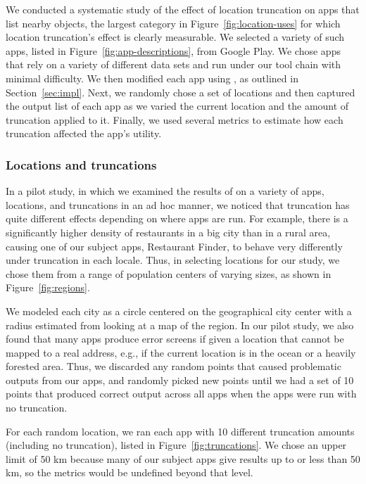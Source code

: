 We conducted a systematic study of the effect of location truncation
on apps that list nearby objects, the largest category in
Figure~\ref{fig:location-uses} for which location truncation's effect is clearly
measurable. We selected a variety of such apps, listed in
Figure~\ref{fig:app-descriptions}, from Google Play. We chose apps
that rely on a variety of different data sets and run under our tool
chain with minimal difficulty.
We then modified each app using \fuzzer, as outlined
in Section~\ref{sec:impl}. Next, we randomly chose a set of locations and
then captured the output list of each app as we varied the current
location and the amount of truncation applied to it. Finally, we used
several metrics to estimate how each truncation affected the app's
utility.

\subsubsection{Locations and truncations}

In a pilot study, in which we examined the results of \fuzzer{} on a
variety of apps, locations, and truncations in an ad hoc manner,
we noticed that truncation has quite different
effects depending on where apps are
run. For example, there is a significantly higher density of restaurants in
a big city than in a rural area, causing one of our subject apps,
Restaurant Finder, to behave very differently under truncation in each locale.
Thus, in selecting locations for
our study, we chose them from a range of population centers of varying
sizes, as shown in Figure~\ref{fig:regions}. 

We modeled each city as a circle centered on the geographical 
city center with a radius estimated
from looking at a map of the region. In
our pilot study, we also found that many apps produce error screens if
given a location that cannot be mapped to a real address, e.g., if the
current location is in the ocean or a heavily forested area.
Thus, we discarded any random points that caused 
problematic outputs from our apps, and randomly picked new
points until we had a set of 10 points that produced correct output
across all apps when the apps were run with no truncation.

For each random location, we ran each app with 10 different truncation
amounts (including no truncation), listed in
Figure~\ref{fig:truncations}.  We chose an upper limit of 50 km because 
many of our subject apps
give results up to or less than 50 km, so the metrics would
be undefined beyond that level.

